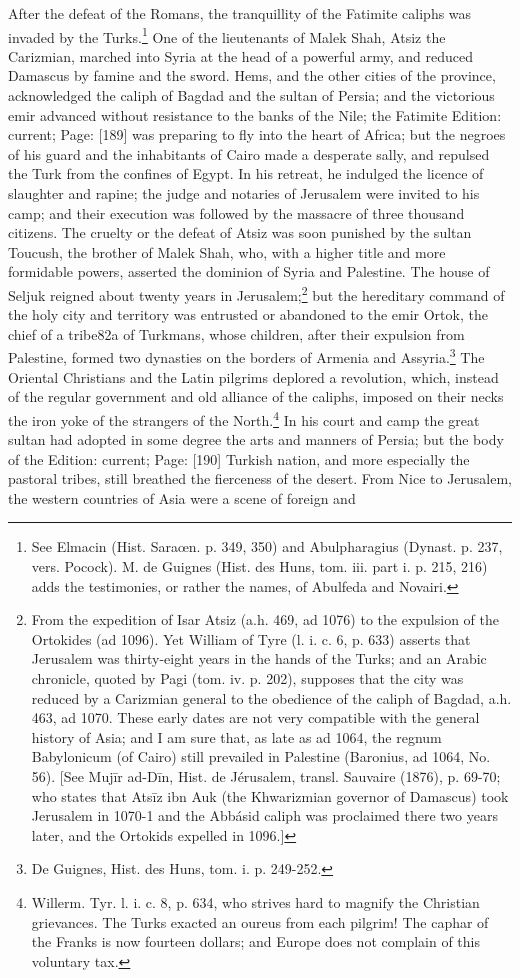 After the defeat of the Romans, the tranquillity of the Fatimite caliphs was invaded by the Turks.\footnote{See Elmacin (Hist. Saraœn. p. 349, 350) and Abulpharagius (Dynast. p. 237, vers. Pocock). M. de Guignes (Hist. des Huns, tom. iii. part i. p. 215, 216) adds the testimonies, or rather the names, of Abulfeda and Novairi.} One of the lieutenants of Malek Shah, Atsiz the Carizmian, marched into Syria at the head of a powerful army, and reduced Damascus by famine and the sword. Hems, and the other cities of the province, acknowledged the caliph of Bagdad and the sultan of Persia; and the victorious emir advanced without resistance to the banks of the Nile; the Fatimite Edition: current; Page: [189] was preparing to fly into the heart of Africa; but the negroes of his guard and the inhabitants of Cairo made a desperate sally, and repulsed the Turk from the confines of Egypt. In his retreat, he indulged the licence of slaughter and rapine; the judge and notaries of Jerusalem were invited to his camp; and their execution was followed by the massacre of three thousand citizens. The cruelty or the defeat of Atsiz was soon punished by the sultan Toucush, the brother of Malek Shah, who, with a higher title and more formidable powers, asserted the dominion of Syria and Palestine. The house of Seljuk reigned about twenty years in Jerusalem;\footnote{From the expedition of Isar Atsiz (a.h. 469, ad 1076) to the expulsion of the Ortokides (ad 1096). Yet William of Tyre (l. i. c. 6, p. 633) asserts that Jerusalem was thirty-eight years in the hands of the Turks; and an Arabic chronicle, quoted by Pagi (tom. iv. p. 202), supposes that the city was reduced by a Carizmian general to the obedience of the caliph of Bagdad, a.h. 463, ad 1070. These early dates are not very compatible with the general history of Asia; and I am sure that, as late as ad 1064, the regnum Babylonicum (of Cairo) still prevailed in Palestine (Baronius, ad 1064, No. 56). [See Mujīr ad-Dīn, Hist. de Jérusalem, transl. Sauvaire (1876), p. 69-70; who states that Atsīz ibn Auk (the Khwarizmian governor of Damascus) took Jerusalem in 1070-1 and the Abbásid caliph was proclaimed there two years later, and the Ortokids expelled in 1096.]} but the hereditary command of the holy city and territory was entrusted or abandoned to the emir Ortok, the chief of a tribe82a of Turkmans, whose children, after their expulsion from Palestine, formed two dynasties on the borders of Armenia and Assyria.\footnote{De Guignes, Hist. des Huns, tom. i. p. 249-252.} The Oriental Christians and the Latin pilgrims deplored a revolution, which, instead of the regular government and old alliance of the caliphs, imposed on their necks the iron yoke of the strangers of the North.\footnote{Willerm. Tyr. l. i. c. 8, p. 634, who strives hard to magnify the Christian grievances. The Turks exacted an oureus from each pilgrim! The caphar of the Franks is now fourteen dollars; and Europe does not complain of this voluntary tax.} In his court and camp the great sultan had adopted in some degree the arts and manners of Persia; but the body of the Edition: current; Page: [190] Turkish nation, and more especially the pastoral tribes, still breathed the fierceness of the desert. From Nice to Jerusalem, the western countries of Asia were a scene of foreign and 